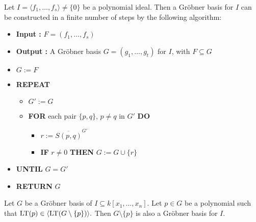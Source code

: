 \begin{theorem}
  \label{thm:Buchberger's_Algorithm}
  Let $I = \langle f_1, \ldots, f_s \rangle \ne \{0\}$ be a polynomial ideal. Then a Gr{\"o}bner basis for $I$ can be constructed in a finite number of steps by the following algorithm:
  \normalfont %
  \begin{itemize}
      \item[] \textbf{Input :} $F = (f_1, \ldots, f_s)$
      \item[] \textbf{Output :} A Gr{\"o}bner basis $G = (g_1, \ldots, g_t)$ for $I$, with $F \subseteq G$
      \vspace{1ex}
      \item[] $G := F$
      \item[] \textbf{REPEAT}
      \begin{itemize}
          \item[] $G' := G$
          \item[] \textbf{FOR} each pair $\{p, q\}$, $p \ne q$ in $G'$ \textbf{DO}
          \begin{itemize}
              \item[] $r := \overline{S(p, q)}^{G'}$
              \item[] \textbf{IF} $r \ne 0$ \textbf{THEN} $G := G \cup \{r\}$
          \end{itemize}
      \end{itemize}
      \item[] \textbf{UNTIL} $G = G'$
      \item[] \textbf{RETURN} $G$
  \end{itemize}
\end{theorem}

\begin{lemma}\label{lem:grobner_basis_remove_redundant} %
    Let $G$ be a Gr{\"o}bner basis of $I \subseteq k[x_1, \ldots, x_n]$.  
    Let $p \in G$ be a polynomial such that $\operatorname{LT}(p) \in \langle \operatorname{LT}(G \setminus \{p\}) \rangle.$  
    Then $G \setminus \{p\}$ is also a Gr{\"o}bner basis for $I$.
\end{lemma}
    